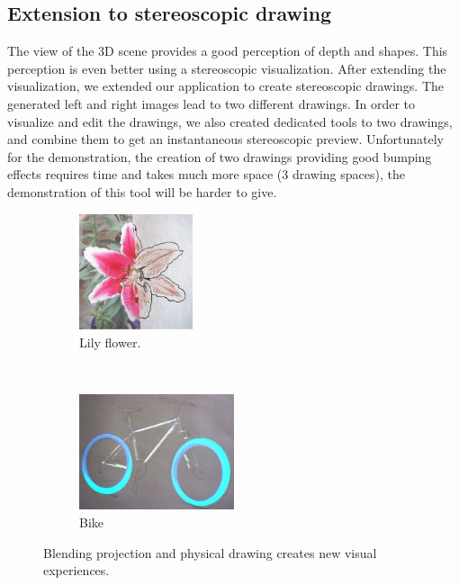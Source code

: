 \documentclass{article}
\begin{document}
\subsection{Extension to stereoscopic drawing} 
The view of the 3D scene provides a good perception of depth and shapes. This perception is even better using a stereoscopic visualization. After extending the visualization, we extended our application to create stereoscopic drawings. The generated left and right images lead to two different drawings. In order to visualize and edit the drawings, we also created dedicated tools to  two drawings, and combine them to get an instantaneous stereoscopic preview. Unfortunately for the demonstration, the creation of two drawings providing good bumping effects requires time and takes much more space (3 drawing spaces), the demonstration of this tool will be harder to give.  

\begin{figure}[!h]
        \begin{subfigure}[b]{0.20\textwidth}
                \centering
                \includegraphics[height=3.4cm]{lys}
                \caption{Lily flower.}
                \label{fig:lys}
        \end{subfigure}%
        ~ %
        \begin{subfigure}[b]{0.25\textwidth}
                \centering
                \includegraphics[height=3.4cm]{velo2}
                \caption{Bike}
                \label{fig:point}
        \end{subfigure}
        \caption{Blending projection and physical drawing creates new visual experiences.}\label{fig:drawings}
\end{figure}
\end{document}
